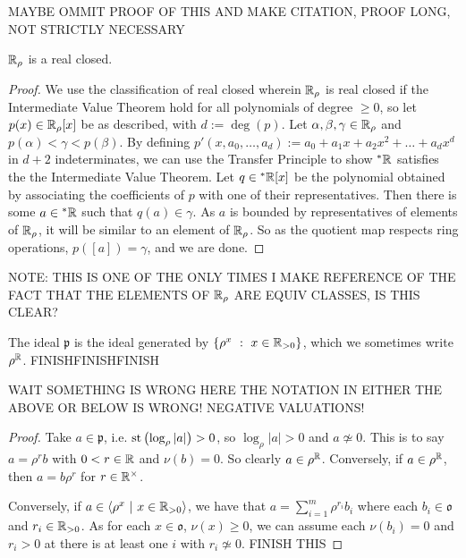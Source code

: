 \documentclass[draft]{amsart}
\DeclareMathOperator{\st}{st}
\begin{document}
    MAYBE OMMIT PROOF OF THIS AND MAKE CITATION, PROOF LONG, NOT STRICTLY NECESSARY
    \begin{prop}
        \(\mathbb{R}_\rho\) is a real closed. 
    \end{prop}
    \begin{proof}
        We use the classification of real closed wherein \(\mathbb{R}_\rho\) is real closed if the Intermediate Value Theorem hold for all polynomials of degree \(\ge 0\), so let \(p(x)\in \mathbb{R}_\rho[x]\) be as described, with \(d:=\deg(p)\). Let \(\alpha ,\beta ,\gamma \in \mathbb{R}_\rho\) and \(p(\alpha)< \gamma < p(\beta )\). By defining \(p'(x,a_0,\dots,a_{d}):=a_0+a_1x+a_2x^2+\dots+a_dx^d\) in \(d+2\) indeterminates, we can use the Transfer Principle to show \(^*\mathbb{R}\) satisfies the the Intermediate Value Theorem. Let \(q\in {^*\mathbb{R}}[x]\) be the polynomial obtained by associating the coefficients of \(p\) with one of their representatives. Then there is some \(a \in {^*\mathbb{R}}\) such that \(q(a)\in \gamma\). As \(a\) is bounded by representatives of elements of \(\mathbb{R}_\rho\), it will be similar to an element of \(\mathbb{R}_\rho\). So as the quotient map respects ring operations, \(p([a])=\gamma\), and we are done.
    \end{proof}
    NOTE: THIS IS ONE OF THE ONLY TIMES I MAKE REFERENCE OF THE FACT THAT THE ELEMENTS OF \(\mathbb{R}_\rho\) ARE EQUIV CLASSES, IS THIS CLEAR?
    \begin{lemma}\label{lemma:generatorOfIdeal}
        The ideal \(\mathfrak p\) is the ideal generated by \(\set{ \rho^x \ }{\ x\in \R_{>0}}\), which we sometimes write \(\rho^{\mathbb{R}}\). FINISHFINISHFINISH
    \end{lemma}

    WAIT SOMETHING IS WRONG HERE THE NOTATION IN EITHER THE ABOVE OR BELOW IS WRONG! NEGATIVE VALUATIONS!
    \begin{proof}
        Take \(a\in \mathfrak p\), i.e. \(\st \p{\log_\rho |a|}>0\), so \(\log_\rho |a|>0\) and \(a\not \simeq 0\). This is to say \(a=\rho^rb\) with \(0<r\in \mathbb{R}\) and \(\nu(b)=0\). So clearly \(a\in \rho^{\mathbb{R}}\). Conversely, if \(a\in \rho^{\mathbb{R}}\), then \(a=b\rho^r\) for \(r\in \mathbb{R}^\times\). 
        
        
        
        
        
        
        Conversely, if \(a\in \langle \rho^x \ |\ x\in \R_{>0} \rangle\), we have that \(a=\sum_{i=1}^m \rho^{r_i}b_i\) where each \(b_i\in \mathfrak o\) and \(r_i\in \mathbb{R}_{>0}\). As for each \(x\in \mathfrak o\), \(\nu(x)\ge 0\), we can assume each \(\nu(b_i)=0\) and \(r_i>0\) at there is at least one \(i\) with \(r_i\not \simeq 0\). FINISH THIS 
        
    \end{proof}
\end{document}
